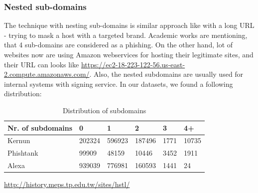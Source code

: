 \documentclass[
  digital, %
  oneside, %
  table,   %
  nolof,     %
  nolot,     %
]{fithesis3}
\newcounter{feature}
\newenvironment{feature}[1]{\stepcounter{feature}%
    \tcolorbox[beamer,%
    noparskip,breakable,
    colback=LightBlue,colframe=DarkBlue,%
    colbacklower=DarkBlue!75!LightBlue,%
    title=Feature~\thefeature: #1]}%
    {\endtcolorbox}
\begin{document}



\subsubsection{Nested sub-domains \cite{url-features-work} \cite{cantina} \cite{new-method-for-detection}
\cite{fresh-phish}}

The technique with nesting sub-domains is similar approach like with a long URL - trying to mask a host with a targeted brand. Academic works are mentioning, that 4 sub-domains are considered as a phishing. On the other hand, lot of websites now are using Amazon webservices for hosting their legitimate sites, and their URL can looks like \url{	https://ec2-18-223-122-56.us-east-2.compute.amazonaws.com/}. Also, the nested subdomains are usually used for internal systems with signing service. In our datasets, we found a following distribution:
\begin{table}[]
\begin{tabular}{l|lllll}
\multicolumn{1}{c|}{Nr. of subdomains} & 0      & 1      & 2      & 3    & 4+    \\ \hline
Kernun                                 & 202324 & 596923 & 187496 & 1771 & 10735 \\
Phishtank                              & 99909  & 48159  & 10446  & 3452 & 1911  \\
Alexa                                  & 939039 & 776981 & 160593 & 1441 & 24   
\end{tabular}
\caption{Distribution of subdomains}
\label{table:subdomain-distribution}
\end{table}

\begin{feature}{Nested sub-domains}
\url{http://history.meps.tp.edu.tw/sites/hstl/}
\end{feature}
\end{document}
